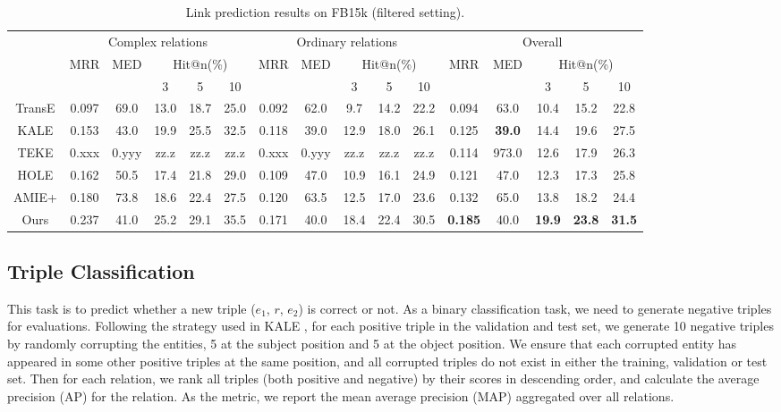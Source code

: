 \begin{table*}[ht]
	\small
	\centering
	\caption{Link prediction results on FB15k (filtered setting).}
	\begin{tabular}{|c|ccccc|ccccc|ccccc|}
		\hline
				&	\multicolumn{5}{c|}{Complex relations}
				&	\multicolumn{5}{c|}{Ordinary relations}
				&	\multicolumn{5}{c|}{Overall}	\\
		\cline{2-16}	
		\multirow{2}{*}{}	&	\multirow{2}{*}{MRR}	&	\multirow{2}{*}{MED}	&	\multicolumn{3}{c|}{Hit@n(\%)}
							&	\multirow{2}{*}{MRR}	&	\multirow{2}{*}{MED}	&	\multicolumn{3}{c|}{Hit@n(\%)}
							&	\multirow{2}{*}{MRR}	&	\multirow{2}{*}{MED}	&	\multicolumn{3}{c|}{Hit@n(\%)}	\\
				&	&	&	3	&	5	&	10	
				&	&	&	3	&	5	&	10	
				&	&	&	3	&	5	&	10	\\
		\hline
		TransE
				&	0.097	&	69.0	&	13.0	&	18.7	&	25.0
				&	0.092	&	62.0	&	 9.7	&	14.2	&	22.2
				&	0.094	&	63.0	&	10.4	&	15.2	&	22.8	\\
		KALE	
				&	0.153	&	43.0	&	19.9	&	25.5	&	32.5
				&	0.118	&	39.0	&	12.9	&	18.0	&	26.1
				&	0.125	&	\textbf{39.0}	&	14.4	&	19.6	&	27.5	\\
		TEKE	
				&	0.xxx	&	0.yyy	&	zz.z	&	zz.z	&	zz.z
				&	0.xxx	&	0.yyy	&	zz.z	&	zz.z	&	zz.z
				&	0.114	&	973.0	&	12.6	&	17.9	&	26.3	\\
		HOLE
				&	0.162	&	50.5	&	17.4	&	21.8	&	29.0
				&	0.109	&	47.0	&	10.9	&	16.1	&	24.9
				&	0.121	&	47.0	&	12.3	&	17.3	&	25.8	\\
		AMIE+
				&	0.180	&	73.8	&	18.6	&	22.4	&	27.5
				&	0.120	&	63.5	&	12.5	&	17.0	&	23.6
				&	0.132	&	65.0	&	13.8	&	18.2	&	24.4	\\
		Ours
				&	0.237	&	41.0	&	25.2	&	29.1	&	35.5
				&	0.171	&	40.0	&	18.4	&	22.4	&	30.5
				&	\textbf{0.185}	&	40.0	&	\textbf{19.9}	&	\textbf{23.8}	&	\textbf{31.5}	\\
		\hline
	\end{tabular}
	\label{tab:link-pred-filtered}
\end{table*}






\subsection{Triple Classification}
This task is to predict whether a new triple ($e_1$, $r$, $e_2$) is correct or not.
As a binary classification task, we need to generate negative triples for evaluations.
Following the strategy used in KALE \cite{guo2016jointly},
for each positive triple in the validation and test set,
we generate 10 negative triples by randomly corrupting the entities, 5 at the subject
position and 5 at the object position. We ensure that each corrupted entity 
has appeared in some other positive triples at the same position,
and all corrupted triples do not exist in either the training, validation or test set.
Then for each relation, we rank all triples (both positive and negative)
by their scores in descending order, and calculate the average precision (AP) for the relation.
As the metric, we report the mean average precision (MAP) aggregated over all relations.

